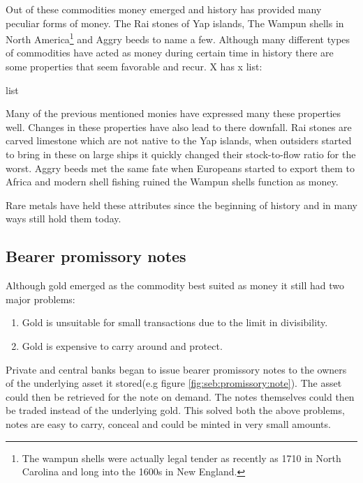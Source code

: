 Out of these commodities money emerged and history has provided many peculiar forms of money. The Rai stones of Yap islands, The Wampun shells in North America\footnote{The wampun shells were actually legal tender as recently as 1710 in North Carolina and long into the 1600s in New England.}\cite{szabo:shelling:out} and Aggry beeds to name a few. Although many different types of commodities have acted as money during certain time in history there are some properties that seem favorable and recur. X has x list:

list

Many of the previous mentioned monies have expressed many these properties well. Changes in these properties have also lead to there downfall. Rai stones are carved limestone which are not native to the Yap islands, when outsiders started to bring in these on large ships it quickly changed their stock-to-flow ratio for the worst\cite{ammous:bitcoin:standard}. Aggry beeds met the same fate when Europeans started to export them to Africa and modern shell fishing ruined the Wampun shells function as money\cite{szabo:shelling:out}.

Rare metals have held these attributes since the beginning of history and in many ways still hold them today.

\subsection{Bearer promissory notes}

Although gold emerged as the commodity best suited as money
it still had two major problems:

\begin{enumerate}
	\item Gold is unsuitable for small transactions due to the limit in divisibility.
	\item Gold is expensive to carry around and protect.
\end{enumerate}

Private and central banks began to issue bearer promissory notes to the owners of the underlying asset it stored(e.g figure \ref{fig:seb:promissory:note}). 
The asset could then be retrieved for the note on demand. The notes themselves could then be traded 
instead of the underlying gold. This solved both the above problems, notes are easy to carry, conceal and 
could be minted in very small amounts. 


